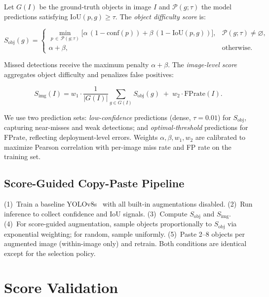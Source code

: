 \documentclass[conference]{IEEEtran}
\begin{document}
Let $G(I)$ be the ground-truth objects in image $I$ and
$\mathcal{P}(g;\tau)$ the model predictions satisfying
$\mathrm{IoU}(p,g)\ge\tau$. The \emph{object difficulty score} is:

\begin{equation}
S_{\mathrm{obj}}(g) =
\begin{cases}
\displaystyle\min_{p\,\in\,\mathcal{P}(g;\tau)}
  \bigl[
    \alpha\,(1 - \mathrm{conf}(p))
    + \beta\,(1 - \mathrm{IoU}(p,g))
  \bigr],
  & \mathcal{P}(g;\tau) \neq \varnothing, \\[4pt]
\alpha + \beta,
  & \text{otherwise.}
\end{cases}
\label{eq:obj}
\end{equation}

Missed detections receive the maximum penalty $\alpha{+}\beta$.
The \emph{image-level score} aggregates object difficulty and
penalizes false positives:

\begin{equation}
S_{\mathrm{img}}(I)
  = w_1 \cdot \frac{1}{|G(I)|}\sum_{g\in G(I)} S_{\mathrm{obj}}(g)
  \;+\; w_2 \cdot \mathrm{FPrate}(I).
\label{eq:img}
\end{equation}

We use two prediction sets: \textit{low-confidence} predictions
(dense, $\tau{=}0.01$) for $S_{\mathrm{obj}}$, capturing near-misses
and weak detections; and \textit{optimal-threshold} predictions for
$\mathrm{FPrate}$, reflecting deployment-level errors.
Weights $\alpha,\beta,w_1,w_2$ are calibrated to maximize Pearson
correlation with per-image miss rate and FP rate on the training set.

\subsection{Score-Guided Copy-Paste Pipeline}

(1)~Train a baseline YOLOv8s~\cite{yolov8} with all built-in
augmentations disabled. (2)~Run inference to collect confidence and
IoU signals. (3)~Compute $S_{\mathrm{obj}}$ and $S_{\mathrm{img}}$.
(4)~For score-guided augmentation, sample objects proportionally to
$S_{\mathrm{obj}}$ via exponential weighting; for random, sample
uniformly. (5)~Paste 2--8 objects per augmented image (within-image
only) and retrain. Both conditions are identical except for the
selection policy.

\section{Score Validation}
\end{document}
